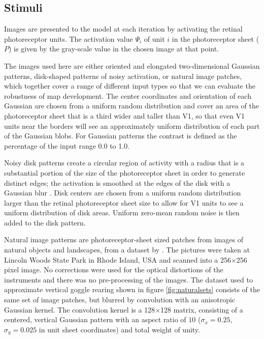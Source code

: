 \documentclass{article}
\begin{document}
\subsection*{Stimuli}

Images are presented to the model at each iteration by activating the
retinal photoreceptor units. The activation value $\Psi_{i}$ of
unit $i$ in the photoreceptor sheet ($P$) is given by the gray-scale
value in the chosen image at that point.

The images used here are either oriented and elongated two-dimensional
Gaussian patterns, disk-shaped patterns of noisy activation, or natural image
patches, which together cover a range of different input types so that
we can evaluate the robustness of map development. The center
coordinates and orientation of each Gaussian are chosen from a uniform
random distribution and cover an area of the photoreceptor sheet that
is a third wider and taller than V1, so that even V1 units near the
borders will see an approximately uniform distribution of each part of
the Gaussian blobs.  For Gaussian patterns the contrast is defined as
the percentage of the input range 0.0 to 1.0.

Noisy disk patterns create a circular region of activity with a radius
that is a substantial portion of the size of the photoreceptor sheet
in order to generate distinct edges; the activation is smoothed at the
edges of the disk with a Gaussian blur
\citep{bednar:neurocomputing04-or}.  Disk centers are chosen from a
uniform random distribution larger than the retinal photoreceptor
sheet size to allow for V1 units to see a uniform distribution of disk
areas.  Uniform zero-mean random noise is then added to the disk
pattern.

Natural image patterns are photoreceptor-sheet sized patches from
images of natural objects and landscapes, from a dataset by
\citet{Shouval1996}.  The pictures were taken at Lincoln Woods State
Park in Rhode Island, USA and scanned into a 256$\times$256 pixel
image. No corrections were used for the optical distortions of the
instruments and there was no pre-processing of the images. The dataset
used to approximate vertical goggle rearing shown
in figure \ref{fig:naturalsets} consists of the same
  set of image patches, but blurred by convolution
  with an anisotropic Gaussian kernel. The convolution kernel is a
  128$\times$128 matrix, consisting of a centered, vertical Gaussian
  pattern with an aspect ratio of $10$ ($\sigma_x=0.25$,
  $\sigma_y=0.025$ in unit sheet coordinates) and total weight of
  unity.
\end{document}
